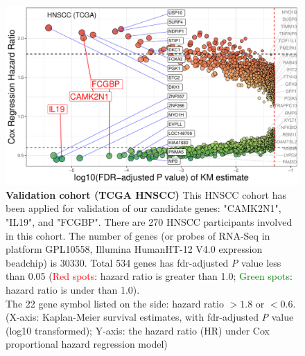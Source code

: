 \documentclass[preprint,12pt]{elsarticle}
\newcommand{\bcaption}[2]{\caption{\textbf{#1} #2}}
\newenvironment{MyColorPar}[1]{%
    \leavevmode\color{#1}\ignorespaces%
}{%
}%
\begin{document}
\begin{MyColorPar}{blue}
\begin{figure}
    \centering
    \includegraphics[width=13cm]{Rplot_TCGA_HNSCC_CoxHR_CAMK2N1_top3FDRKM.pdf}
    \bcaption{Validation cohort (TCGA HNSCC)}{
    This HNSCC cohort has been applied for validation of our candidate genes: "CAMK2N1", "IL19", and "FCGBP".
    There are 270 HNSCC participants involved in this cohort.
    The number of genes (or probes of RNA-Seq in platform GPL10558, Illumina HumanHT-12 V4.0 expression beadchip) is 30330.
    Total 534 genes has \acrshort{fdr}-adjusted \textit{P} value less than 0.05
    (\textcolor{red}{Red spots}: hazard ratio is greater than 1.0;
    \textcolor{green}{Green spots}: hazard ratio is under than 1.0).\\
    The 22 gene symbol listed on the side: hazard ratio $> 1.8$ or $< 0.6$.\\
    (X-axis: Kaplan-Meier survival estimates, with \acrshort{fdr}-adjusted \textit{P} value (log10 transformed);
    Y-axis: the hazard ratio (HR) under Cox proportional hazard regression model)
    }
    \label{fig:hazards3}
\end{figure}





\end{MyColorPar}
\end{document}
